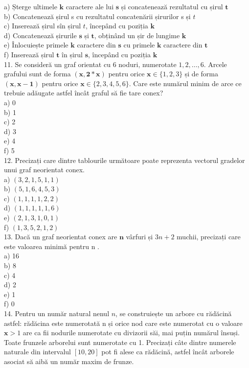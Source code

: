 \documentclass[10pt]{article}
\begin{document}
a) Șterge ultimele $\mathbf{k}$ caractere ale lui $\mathbf{s}$ și concatenează rezultatul cu șirul $\mathbf{t}$\\
b) Concatenează șirul s cu rezultatul concatenării șirurilor s și $t$\\
c) Inserează șirul sîn șirul $t$, începând cu poziția $\mathbf{k}$\\
d) Concatenează șirurile $\mathbf{s}$ și $\mathbf{t}$, obținând un șir de lungime $\mathbf{k}$\\
e) Înlocuiește primele $\mathbf{k}$ caractere din $\mathbf{s}$ cu primele $\mathbf{k}$ caractere din $\mathbf{t}$\\
f) Inserează șirul $\mathbf{t}$ în șirul $\mathbf{s}$, începând cu poziția $\mathbf{k}$\\
11. Se consideră un graf orientat cu 6 noduri, numerotate $1,2, \ldots, 6$. Arcele grafului sunt de forma $(\mathbf{x}, \mathbf{2 *} \mathbf{x})$ pentru orice $\mathbf{x} \in\{1,2,3\}$ și de forma $(\mathbf{x}, \mathbf{x}-\mathbf{1})$ pentru orice $\mathbf{x} \in\{2,3,4,5,6\}$. Care este numărul minim de arce ce trebuie adăugate astfel încât graful să fie tare conex?\\
a) 0\\
b) 1\\
c) 2\\
d) 3\\
e) 4\\
f) 5\\
12. Precizați care dintre tablourile următoare poate reprezenta vectorul gradelor unui graf neorientat conex.\\
a) $(3,2,1,5,1,1)$\\
b) $(5,1,6,4,5,3)$\\
c) $(1,1,1,1,2,2)$\\
d) $(1,1,1,1,1,6)$\\
e) $(2,1,3,1,0,1)$\\
f) $(1,3,5,2,1,2)$\\
13. Dacă un graf neorientat conex are $\mathbf{n}$ vârfuri și $3 n+2$ muchii, precizați care este valoarea minimă pentru n .\\
a) 16\\
b) 8\\
c) 4\\
d) 2\\
e) 1\\
f) 0\\
14. Pentru un număr natural nenul $n$, se construiește un arbore cu rădăcină astfel: rădăcina este numerotată n și orice nod care este numerotat cu o valoare $\mathbf{x}>1$ are ca fii nodurile numerotate cu divizorii săi, mai puțin numărul însuși. Toate frunzele arborelui sunt numerotate cu 1. Precizați câte dintre numerele naturale din intervalul $[10,20]$ pot fi alese ca rădăcină, astfel încât arborele asociat să aibă un număr maxim de frunze.\\
\end{document}
